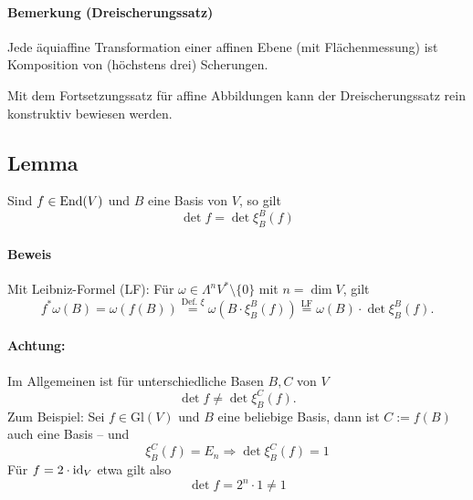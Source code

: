 \begin{figure}[h]
 		\end{figure}

 	\paragraph{Bemerkung (Dreischerungssatz)}
 		Jede äquiaffine Transformation einer affinen Ebene (mit Flächenmessung) ist Komposition von (höchstens drei) Scherungen.

 		Mit dem Fortsetzungssatz für affine Abbildungen kann der Dreischerungssatz rein konstruktiv bewiesen werden.
 \subsection{Lemma}
 	Sind $ f\in \operatorname{End}(V) $ und $ B $ eine Basis von $ V $, so gilt
 	\[
 		\det f = \det \xi_B^B(f)
 	\]
 	\paragraph{Beweis}
 		Mit Leibniz-Formel (LF): Für $ \omega\in \Lambda^nV^*\setminus\{0\} $ mit $ n=\dim V $, gilt
 		\[
 			f^*\omega(B) = \omega(f(B)) \overset{\text{Def. }\xi}{=} \omega(B\cdot \xi_B^B(f))
 			\overset{\text{LF}}{=} \omega(B)\cdot \det \xi_B^B(f).
 		\]
 	\paragraph{Achtung:}
 		Im Allgemeinen ist für unterschiedliche Basen $ B,C $ von $ V $
 		\[
 			\det f \neq \det \xi_B^C(f).
 		\]
 		Zum Beispiel: Sei $ f\in \mathrm{Gl}(V) $ und $ B $ eine beliebige Basis, dann ist $ C:=f(B) $ auch eine Basis -- und
 		\[
 			\xi_B^C(f) = E_n \Rightarrow \det \xi_B^C(f) = 1
 		\]
 		Für $ f=2\cdot \operatorname{id}_V $ etwa gilt also
 		\[
 			\det f = 2^n \cdot 1\neq 1
 		\]
